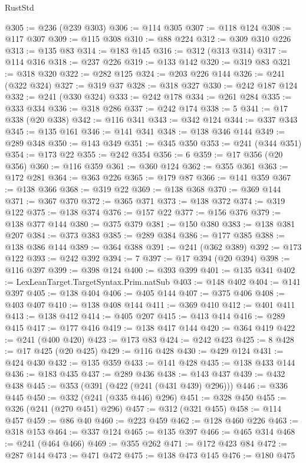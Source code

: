 \begin{lexlean}{RustStd}
\begin{coremodule}
@305 := @236 (@239 @303)
@306 := @114 @305
@307 := @118 @124
@308 := @117 @307
@309 := @115 @308
@310 := @88 @224
@312 := @309 @310 @226
@313 := @135 @83
@314 := @183 @145
@316 := @312 (@313 @314)
@317 := @114 @316
@318 := @237 @226
@319 := @133 @142
@320 := @319 @83
@321 := @318 @320
@322 := @282 @125
@324 := @203 @226 @144
@326 := @241 (@322 @324)
@327 := @319 @37
@328 := @318 @327
@330 := @242 @187 @124
@332 := @241 (@330 @324)
@333 := @242 @178
@334 := @261 @284
@335 := @333 @334
@336 := @318 @286
@337 := @242 @174
@338 := 5
@341 := @17 @338 (@20 @338)
@342 := @116 @341
@343 := @342 @124
@344 := @337 @343
@345 := @135 @161
@346 := @141 @341
@348 := @138 @346 @144
@349 := @289 @348
@350 := @143 @349
@351 := @345 @350
@353 := @241 (@344 @351)
@354 := @173 @22
@355 := @242 @354
@356 := 6
@359 := @17 @356 (@20 @356)
@360 := @116 @359
@361 := @360 @124
@362 := @355 @361
@363 := @172 @281
@364 := @363 @226
@365 := @179 @87
@366 := @141 @359
@367 := @138 @366
@368 := @319 @22
@369 := @138 @368
@370 := @369 @144
@371 := @367 @370
@372 := @365 @371
@373 := @138 @372
@374 := @319 @122
@375 := @138 @374
@376 := @157 @22
@377 := @156 @376
@379 := @138 @377 @144
@380 := @375 @379
@381 := @150 @380
@383 := @138 @381 @207
@384 := @373 @383
@385 := @289 @384
@386 := @177 @385
@388 := @138 @386 @144
@389 := @364 @388
@391 := @241 (@362 @389)
@392 := @173 @122
@393 := @242 @392
@394 := 7
@397 := @17 @394 (@20 @394)
@398 := @116 @397
@399 := @398 @124
@400 := @393 @399
@401 := @135 @341
@402 := LexLeanTarget.TargetSyntax.Prim.natSub
@403 := @148 @402
@404 := @141 @397
@405 := @138 @404
@406 := @405 @144
@407 := @375 @406
@408 := @403 @407
@410 := @138 @408 @144
@411 := @369 @410
@412 := @401 @411
@413 := @138 @412
@414 := @405 @207
@415 := @413 @414
@416 := @289 @415
@417 := @177 @416
@419 := @138 @417 @144
@420 := @364 @419
@422 := @241 (@400 @420)
@423 := @173 @83
@424 := @242 @423
@425 := 8
@428 := @17 @425 (@20 @425)
@429 := @116 @428
@430 := @429 @124
@431 := @424 @430
@432 := @135 @359
@433 := @141 @428
@435 := @138 @433 @144
@436 := @183 @435
@437 := @289 @436
@438 := @143 @437
@439 := @432 @438
@445 := @353 (@391 (@422 (@241 (@431 @439) @296)))
@446 := @336 @445
@450 := @332 (@241 (@335 @446) @296)
@451 := @328 @450
@455 := @326 (@241 (@270 @451) @296)
@457 := @312 (@321 @455)
@458 := @114 @457
@459 := @86 @40
@460 := @223 @459
@462 := @128 @460 @226
@463 := @318 @153
@464 := @337 @124
@465 := @135 @397
@466 := @465 @314
@468 := @241 (@464 @466)
@469 := @355 @262
@471 := @172 @423 @84
@472 := @287 @144
@473 := @471 @472
@475 := @138 @473 @145
@476 := @180 @475

\end{coremodule}
\end{lexlean}
